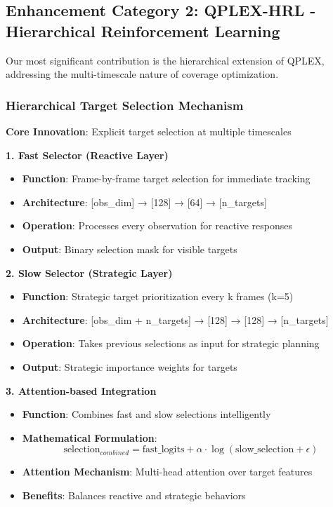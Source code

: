 \documentclass[12pt,a4paper]{report}
\begin{document}
\subsection{Enhancement Category 2: QPLEX-HRL - Hierarchical Reinforcement Learning}

Our most significant contribution is the hierarchical extension of QPLEX, addressing the multi-timescale nature of coverage optimization.

\subsubsection{Hierarchical Target Selection Mechanism}
\textbf{Core Innovation}: Explicit target selection at multiple timescales

\textbf{1. Fast Selector (Reactive Layer)}
\begin{itemize}
\item \textbf{Function}: Frame-by-frame target selection for immediate tracking
\item \textbf{Architecture}: [obs\_dim] → [128] → [64] → [n\_targets]
\item \textbf{Operation}: Processes every observation for reactive responses
\item \textbf{Output}: Binary selection mask for visible targets
\end{itemize}

\textbf{2. Slow Selector (Strategic Layer)}
\begin{itemize}
\item \textbf{Function}: Strategic target prioritization every k frames (k=5)
\item \textbf{Architecture}: [obs\_dim + n\_targets] → [128] → [128] → [n\_targets]
\item \textbf{Operation}: Takes previous selections as input for strategic planning
\item \textbf{Output}: Strategic importance weights for targets
\end{itemize}

\textbf{3. Attention-based Integration}
\begin{itemize}
\item \textbf{Function}: Combines fast and slow selections intelligently
\item \textbf{Mathematical Formulation}:
$$\text{selection}_{combined} = \text{fast\_logits} + \alpha \cdot \log(\text{slow\_selection} + \epsilon)$$
\item \textbf{Attention Mechanism}: Multi-head attention over target features
\item \textbf{Benefits}: Balances reactive and strategic behaviors
\end{itemize}
\end{document}
